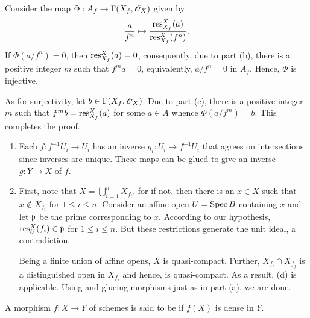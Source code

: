\begin{exercise}
\begin{enumerate}[label=(\alph*)]
Consider the map $\Phi: A_f\to\Gamma(X_f,\mathscr{O}_X)$ given by 
\begin{equation*}
    \frac{a}{f^n}\mapsto\frac{\operatorname{res}^X_{X_f}(a)}{\operatorname{res}^{X}_{X_f}(f^n)}.
\end{equation*} 
If $\Phi(a/f^n) = 0$, then $\operatorname{res}^X_{X_f}(a) = 0$, consequently, due to part (b), there is a positive integer $m$ such that $f^ma = 0$, equivalently, $a/f^n = 0$ in $A_f$. Hence, $\Phi$ is injective.

As for surjectivity, let $b\in\Gamma(X_f,\mathscr{O}_X)$. Due to part (c), there is a positive integer $m$ such that $f^mb = \operatorname{res}^X_{X_f}(a)$ for some $a\in A$ whence $\Phi(a/f^m) = b$. This completes the proof.
\end{enumerate} 
\end{exercise}

\begin{exercise}\hfill %
\begin{enumerate}[label=(\alph*)]
    \item Each $f: f^{-1}U_i\to U_i$ has an inverse $g_i: U_i\to f^{-1}U_i$ that agrees on intersections since inverses are unique. These maps can be glued to give an inverse $g: Y\to X$ of $f$.

    \item First, note that $X = \bigcup\limits_{i = 1}^n X_{f_i}$, for if not, then there is an $x\in X$ such that $x\notin X_{f_i}$ for $1\le i\le n$. Consider an affine open $U = \operatorname{Spec} B$ containing $x$ and let $\mathfrak{p}$ be the prime corresponding to $x$. According to our hypothesis, $\operatorname{res}^X_{U}(f_i)\in\mathfrak{p}$ for $1\le i\le n$. But these restrictions generate the unit ideal, a contradiction. 

    Being a finite union of affine opens, $X$ is quasi-compact. Further, $X_{f_i}\cap X_{f_j}$ is a distinguished open in $X_{f_i}$ and hence, is quasi-compact. As a result,  (d) is applicable. Using  and glueing morphisms just as in part (a), we are done.
\end{enumerate}
\end{exercise}

\begin{definition}
    A morphism $f: X\to Y$ of schemes is said to be  if $f(X)$ is dense in $Y$.
\end{definition}

